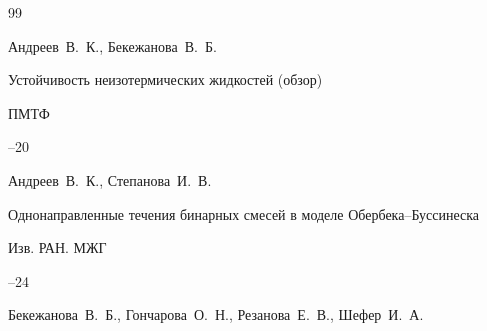 \begin{thebibliography}{99}

\by Андреев~В.~К., Бекежанова~В.~Б.

\paper Устойчивость неизотермических жидкостей (обзор)

\jour ПМТФ




--20















\by Андреев~В.~К., Степанова~И.~В.

\paper Однонаправленные течения бинарных смесей в моделе Обербека--Буссинеска

\jour  Изв. РАН. МЖГ




--24














\by Бекежанова~В.~Б., Гончарова~О.~Н., Резанова~Е.~В., Шефер~И.~А.


\end{thebibliography}
